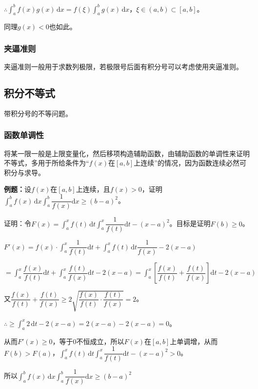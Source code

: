 \documentclass[UTF8, 12pt]{ctexart}
\begin{document}
$\therefore\int_a^bf(x)g(x)\,\textrm{d}x=f(\xi)\int_a^bg(x)\,\textrm{d}x$，$\xi\in(a,b)\subset[a,b]$。

同理$g(x)<0$也如此。

\subsubsection{夹逼准则}

夹逼准则一般用于求数列极限，若极限号后面有积分号可以考虑使用夹逼准则。

\subsection{积分不等式}

带积分号的不等问题。

\subsubsection{函数单调性}

将某一限一般是上限变量化，然后移项构造辅助函数，由辅助函数的单调性来证明不等式，多用于所给条件为“$f(x)$在$[a,b]$上连续”的情况，因为函数连续必然可积分与求导。

\textbf{例题：}设$f(x)$在$[a,b]$上连续，且$f(x)>0$，证明$\displaystyle{\int_a^bf(x)\,\textrm{d}x\int_a^b\dfrac{1}{f(x)}\textrm{d}x}\geqslant(b-a)^2$。

证明：令$F(x)=\displaystyle{\int_a^xf(t)\,\textrm{d}t\int_a^x\dfrac{1}{f(t)}\textrm{d}t-(x-a)^2}$。目标是证明$F(b)\geqslant0$。

$F'(x)=f(x)\cdot\displaystyle{\int_a^x\dfrac{1}{f(t)}\textrm{d}t+\int_a^xf(t)\,\textrm{d}t\dfrac{1}{f(x)}}-2(x-a)$

$=\displaystyle{\int_a^x\dfrac{f(x)}{f(t)}\textrm{d}t+\int_a^x\dfrac{f(t)}{f(x)}\textrm{d}t-2(x-a)=\int_a^x\left[\dfrac{f(x)}{f(t)}+\dfrac{f(t)}{f(x)}\right]\textrm{d}t-2(x-a)}$

又$\dfrac{f(x)}{f(t)}+\dfrac{f(t)}{f(x)}\geqslant2\sqrt{\dfrac{f(x)}{f(t)}\cdot\dfrac{f(t)}{f(x)}}=2$。

$\therefore\geqslant\int_a^x2\,\textrm{d}t-2(x-a)=2(x-a)-2(x-a)=0$。

从而$F'(x)\geqslant0$，等于0不恒成立，所以$F(x)$在$[a,b]$上单调增，从而$F(b)>F(a)$，$\displaystyle{\int_a^xf(t)\,\textrm{d}t\int_a^x\dfrac{1}{f(t)}\textrm{d}t-(x-a)^2}>0$。

所以$\displaystyle{\int_a^bf(x)\,\textrm{d}x\int_a^b\dfrac{1}{f(x)}\textrm{d}x}\geqslant(b-a)^2$
\end{document}
